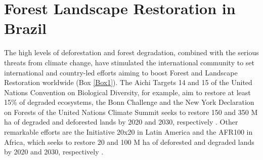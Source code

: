 


\chapter{Forest Landscape Restoration in Brazil} \label{ch:intro}

The  high levels of deforestation and forest degradation, combined with the serious threats from climate change, have stimulated the international community to set international and country-led efforts aiming to boost Forest and Landscape Restoration worldwide (Box \ref{Box1}). The Aichi Targets 14 and 15 of the United Nations Convention on Biological Diversity, for example, aim to restore at least 15\% of degraded ecosystems, the Bonn Challenge and the New York Declaration on Forests of the United Nations 
 Climate Summit seeks to restore 150 and 350 M ha of degraded and deforested lands by 2020 and 2030, respectively \citep{Chazdon2017d}. Other remarkable efforts are the Initiative 20x20 in Latin America and the AFR100  in Africa, which seeks to restore 20 and 100 M ha of deforested and  degraded lands by 2020 and 2030, respectively \citep{Chazdon2017b}.
 


